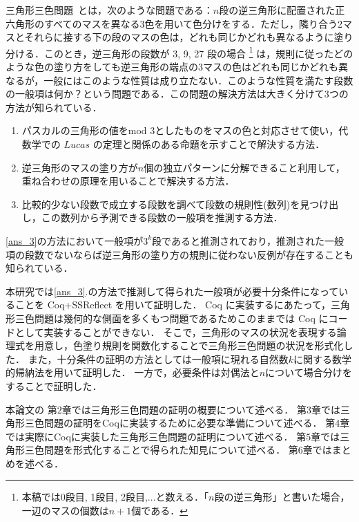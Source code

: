 三角形三色問題~\cite{Nishiyama1,Nishiyama2,Nishiyama3}とは，次のような問題である：$n$段の逆三角形に配置された正六角形のすべてのマスを異なる3色を用いて色分けをする．ただし，隣り合う2マスとそれらに接する下の段のマスの色は，どれも同じかどれも異なるように塗り分ける．このとき，逆三角形の段数が 3, 9, 27 段の場合 \footnote{本稿では0段目, 1段目, 2段目,$\ldots$と数える．「$n$段の逆三角形」と書いた場合，一辺のマスの個数は$n+1$個である．} は，規則に従ったどのような色の塗り方をしても逆三角形の端点の3マスの色はどれも同じかどれも異なるが，一般にはこのような性質は成り立たない．このような性質を満たす段数の一般項は何か？という問題である．この問題の解決方法は大きく分けて3つの方法が知られている．\cite{Nishiyama1}
\begin{enumerate}
\item \label{ans_1}
  パスカルの三角形の値をmod $3$としたものをマスの色と対応させて使い，代数学での $Lucas$ の定理と関係のある命題を示すことで解決する方法．
\item \label{ans_2}
  逆三角形のマスの塗り方が$n$個の独立パターンに分解できること利用して，重ね合わせの原理を用いることで解決する方法．
\item \label{ans_3}
  比較的少ない段数で成立する段数を調べて段数の規則性(数列)を見つけ出し，この数列から予測できる段数の一般項を推測する方法．
\end{enumerate}
\ref{ans_3}の方法において一般項が$3^k$段であると推測されており，推測された一般項の段数でないならば逆三角形の塗り方の規則に従わない反例が存在することも知られている．

本研究では\ref{ans_3}.の方法で推測して得られた一般項が必要十分条件になっていることを Coq+SSReflect を用いて証明した．
Coq に実装するにあたって，三角形三色問題は幾何的な側面を多くもつ問題であるためこのままでは Coq にコードとして実装することができない．
そこで，三角形のマスの状況を表現する論理式を用意し，色塗り規則を関数化することで三角形三色問題の状況を形式化した．
また，十分条件の証明の方法としては一般項に現れる自然数$k$に関する数学的帰納法を用いて証明した．
一方で，必要条件は対偶法と$n$について場合分けをすることで証明した．

本論文の
第$2$章では三角形三色問題の証明の概要について述べる．
第$3$章では三角形三色問題の証明をCoqに実装するために必要な準備について述べる．
第$4$章では実際にCoqに実装した三角形三色問題の証明について述べる．
第$5$章では三角形三色問題を形式化することで得られた知見について述べる．
第$6$章ではまとめを述べる．

